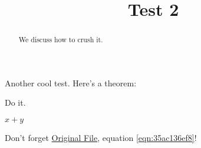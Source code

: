 \documentclass[reqno]{amsart} 
\title{Test 2}
\begin{document}
\maketitle

\begin{abstract}
  We discuss how to crush it.
\end{abstract}


Another cool test.  Here's a theorem:
\begin{theorem}\label{theorem:35ac204d35}
  Do it.
\end{theorem}

$x + y$

Don't forget \href{test.pdf}{Original File}, equation \eqref{eqn:35ac136ef8}!





{} 
\end{document}
